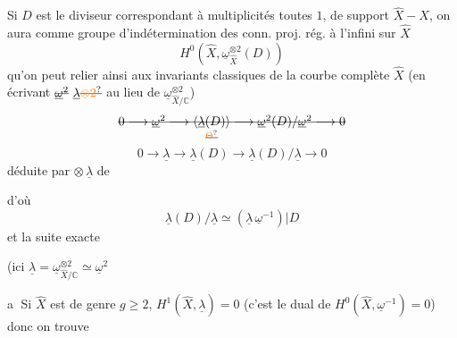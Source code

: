 Si $D$ est le diviseur correspondant
 à multiplicités toutes $1$, de support $\widehat X-X$,
on aura comme groupe d'indétermination
des conn. proj. rég. à l'infini sur $\widehat X$
\[
 H^0(\widehat X,\underline\omega_{\widehat X}^{\otimes2}(D))
\]
qu'on peut relier ainsi aux invariants classiques
de la courbe complète $\widehat X$ (en écrivant
 $\deleted{\underline{\omega}^{2}}\ \underline\lambda\deleted{\unsure{\otimes2}}$ au lieu de $\underline{\omega}^{\otimes2}_{\widehat X/\mathbb C}$)
\[
\deleted{0\longrightarrow\underline{\omega}^{2}\longrightarrow
 \underset{\deleted{\unsure{\Theta}}}{\inserted{\underline\lambda(D)}}\longrightarrow
 \underline{\omega}^{2}(D)/\underline{\omega}^{2}\longrightarrow0}
\]
\[
0\longrightarrow\underline\lambda\longrightarrow\underline\lambda(D)
\longrightarrow\underline\lambda(D)/\underline\lambda\longrightarrow0
\]
déduite par $\otimes\,\underline\lambda$ de


d'où
\[
\underline\lambda(D)/\underline\lambda\simeq(\underline\lambda\,\underline\omega^{-1})|D
\]
et la suite exacte


(ici $\underline\lambda=\underline\omega_{\widehat X/\mathbb C}^{\otimes2}\simeq\underline\omega^{2}$

 \textcircled{a} Si $\widehat X$ est de genre $g\geq2$, $H^1(\widehat X,\underline\lambda)=0$
(c'est le dual de $H^0(\widehat X,\underline\omega^{-1})=0$) donc on
trouve

